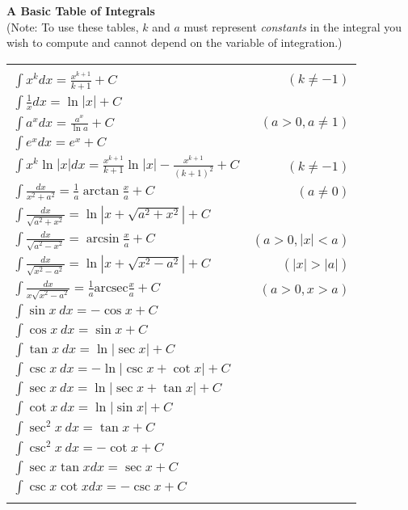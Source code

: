 \documentclass{ximera}
\begin{document}
\begin{center}
\textbf{A Basic Table of Integrals} \\ \label{table_of_integrals}
(Note: To use these tables, $k$ and $a$ must represent \textit{constants} in the integral you wish to compute and cannot depend on the variable of integration.)
\begin{tabular}{|lr|}
\hline
\vspace{-10pt}&   \\
$\displaystyle \int x^k dx = \frac{x^{k+1}}{k+1} + C$ & $(k \neq -1)$ \\ $\displaystyle \int \frac{1}{x} dx = \ln |x| + C$ & \\
$\displaystyle \int a^x dx = \frac{a^x}{\ln a} + C$  &  $(a > 0, a \neq 1)$  \\   $\displaystyle \int e^x dx = e^x + C$ & \\
$\displaystyle \int x^k \ln |x| dx = \frac{x^{k+1}}{k+1} \ln |x| - \frac{x^{k+1}}{(k+1)^2} + C$  \hspace{-8pt} & $(k \neq -1)$  \\  $\displaystyle \int \frac{dx}{x^2 + a^2} = \frac{1}{a} \arctan \frac{x}{a} + C$ & $(a \neq 0)$ \\
$\displaystyle \int \frac{dx}{\sqrt{a^2 + x^2}} = \ln \left|x + \sqrt{a^2 + x^2}\right| + C$ & \\ $\displaystyle \int \frac{dx}{\sqrt{a^2 - x^2}} = \arcsin \frac{x}{a} + C$ & $(a > 0, |x| < a)$  \\
$\displaystyle \int \frac{dx}{\sqrt{x^2 - a^2}} = \ln \left| x + \sqrt{x^2-a^2} \right| + C$ & $(|x| > |a|)$ \\ $\displaystyle \int \frac{dx}{x \sqrt{x^2 - a^2}} = \frac{1}{a} \mathrm{arcsec} \frac{x}{a} + C$ & $(a > 0, x > a)$ \\
$\displaystyle \int \sin x ~dx = - \cos x + C$ & \\ $\displaystyle \int \cos x ~dx = \sin x + C$ & \\
$\displaystyle \int \tan x ~dx = \ln |\sec x| + C$ & \\ $\displaystyle \int \csc x ~dx = - \ln |\csc x + \cot x| + C$ \hspace{-18pt} & \\
$\displaystyle \int \sec x ~dx = \ln |\sec x + \tan x| + C$ & \\ $\displaystyle \int \cot x ~dx = \ln |\sin x| + C$ & \\
$\displaystyle \int \sec^2 x ~ dx = \tan x + C$ & \\ $\displaystyle \int \csc^2 x ~dx = - \cot x + C$ & \\
$\displaystyle \int \sec x \tan x dx = \sec x + C$  & \\ $\displaystyle \int \csc x \cot x dx = - \csc x + C$ &  \vspace{-8pt} \\
&   \\
\hline
\end{tabular}
\end{center}
\end{document}
